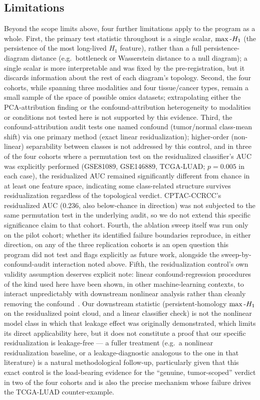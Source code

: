 \subsection{Limitations}

Beyond the scope limits above, four further limitations apply to the program as a whole. First, the primary
test statistic throughout is a single scalar, $\max\text{-}H_1$ (the persistence of the most long-lived $H_1$
feature), rather than a full persistence-diagram distance (e.g.\ bottleneck or Wasserstein distance to a
null diagram); a single scalar is more interpretable and was fixed by the pre-registration, but it discards
information about the rest of each diagram's topology. Second, the four cohorts, while spanning three
modalities and four tissue/cancer types, remain a small sample of the space of possible omics datasets;
extrapolating either the PCA-attribution finding or the confound-attribution heterogeneity to modalities or
conditions not tested here is not supported by this evidence. Third, the confound-attribution audit tests
one named confound (tumor/normal class-mean shift) via one primary method (exact linear residualization);
higher-order (non-linear) separability between classes is not addressed by this control, and in three of
the four cohorts where a permutation test on the residualized classifier's AUC was explicitly performed
(GSE81089, GSE146889, TCGA-LUAD; $p=0.005$ in each case), the residualized AUC remained significantly
different from chance in at least one feature space, indicating some class-related structure survives
residualization regardless of the topological verdict. CPTAC-CCRCC's residualized AUC (0.236, also
below-chance in direction) was not subjected to the same permutation test in the underlying audit, so we
do not extend this specific significance claim to that cohort. Fourth, the ablation sweep itself was run only on the pilot cohort; whether its
identified failure boundaries reproduce, in either direction, on any of the three replication cohorts is an
open question this program did not test and flags explicitly as future work, alongside the
sweep-by-confound-audit interaction noted above. Fifth, the residualization control's own validity assumption
deserves explicit note: linear confound-regression procedures of the kind used here have been shown, in other
machine-learning contexts, to interact unpredictably with downstream nonlinear analysis rather than cleanly
removing the confound~\cite{hamdan2023}. Our downstream statistic (persistent-homology $\max\text{-}H_1$ on the
residualized point cloud, and a linear classifier check) is not the nonlinear model class in which that
leakage effect was originally demonstrated, which limits its direct applicability here, but it does not
constitute a proof that our specific residualization is leakage-free --- a fuller treatment (e.g.\ a
nonlinear residualization baseline, or a leakage-diagnostic analogous to the one in that literature) is a
natural methodological follow-up, particularly given that this exact control is the load-bearing evidence
for the ``genuine, tumor-scoped'' verdict in two of the four cohorts and is also the precise mechanism whose
failure drives the TCGA-LUAD counter-example.

